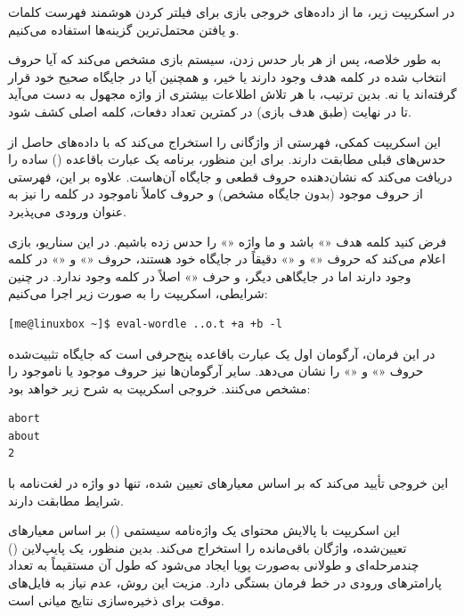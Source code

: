 در اسکریپت زیر، ما از داده‌های خروجی بازی برای فیلتر کردن هوشمند فهرست کلمات و یافتن محتمل‌ترین گزینه‌ها استفاده می‌کنیم.

به طور خلاصه، پس از هر بار حدس زدن، سیستم بازی مشخص می‌کند که آیا حروف انتخاب شده در کلمه هدف وجود دارند یا خیر، و همچنین آیا در جایگاه صحیح خود قرار گرفته‌اند یا نه. بدین ترتیب، با هر تلاش اطلاعات بیشتری از واژه مجهول به دست می‌آید تا در نهایت (طبق هدف بازی) در کمترین تعداد دفعات، کلمه اصلی کشف شود.

این اسکریپت کمکی، فهرستی از واژگانی را استخراج می‌کند که با داده‌های حاصل از حدس‌های قبلی مطابقت دارند. برای این منظور، برنامه یک عبارت باقاعده () ساده را دریافت می‌کند که نشان‌دهنده حروف قطعی و جایگاه آن‌هاست. علاوه بر این، فهرستی از حروف موجود (بدون جایگاه مشخص) و حروف کاملاً ناموجود در کلمه را نیز به عنوان ورودی می‌پذیرد.

فرض کنید کلمه هدف «» باشد و ما واژه «» را حدس زده باشیم. در این سناریو، بازی اعلام می‌کند که حروف «» و «» دقیقاً در جایگاه خود هستند، حروف «» و «» در کلمه وجود دارند اما در جایگاهی دیگر، و حرف «» اصلاً در کلمه وجود ندارد. در چنین شرایطی، اسکریپت را به صورت زیر اجرا می‌کنیم:

\begin{latin}
\begin{lstlisting}
[me@linuxbox ~]$ eval-wordle ..o.t +a +b -l
\end{lstlisting}
\end{latin}

در این فرمان، آرگومان اول یک عبارت باقاعده پنج‌حرفی است که جایگاه تثبیت‌شده حروف «» و «» را نشان می‌دهد. سایر آرگومان‌ها نیز حروف موجود یا ناموجود را مشخص می‌کنند. خروجی اسکریپت به شرح زیر خواهد بود:

\begin{latin}
\begin{lstlisting}
abort
about
2
\end{lstlisting}
\end{latin}

این خروجی تأیید می‌کند که بر اساس معیارهای تعیین شده، تنها دو واژه در لغت‌نامه با شرایط مطابقت دارند.

این اسکریپت با پالایش محتوای یک واژه‌نامه سیستمی () بر اساس معیارهای تعیین‌شده، واژگان باقی‌مانده را استخراج می‌کند. بدین منظور، یک پایپ‌لاین () چندمرحله‌ای و طولانی به‌صورت پویا ایجاد می‌شود که طول آن مستقیماً به تعداد پارامترهای ورودی در خط فرمان بستگی دارد. مزیت این روش، عدم نیاز به فایل‌های موقت برای ذخیره‌سازی نتایج میانی است.

